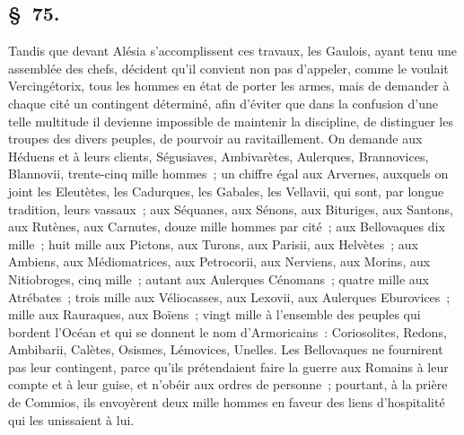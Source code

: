 \documentclass[french,twoside]{book} %
\begin{document}
\subsection[{§ 75.}]{ \textsc{§ 75.} }
\noindent Tandis que devant Alésia s’accomplissent ces travaux, les Gaulois, ayant tenu une assemblée des chefs, décident qu’il convient non pas d’appeler, comme le voulait Vercingétorix, tous les hommes en état de porter les armes, mais de demander à chaque cité un contingent déterminé, afin d’éviter que dans la confusion d’une telle multitude il devienne impossible de maintenir la discipline, de distinguer les troupes des divers peuples, de pourvoir au ravitaillement. On demande aux Héduens et à leurs clients, Ségusiaves, Ambivarètes, Aulerques, Brannovices, Blannovii, trente-cinq mille hommes ; un chiffre égal aux Arvernes, auxquels on joint les Eleutètes, les Cadurques, les Gabales, les Vellavii, qui sont, par longue tradition, leurs vassaux ; aux Séquanes, aux Sénons, aux Bituriges, aux Santons, aux Rutènes, aux Carnutes, douze mille hommes par cité ; aux Bellovaques dix mille ; huit mille aux Pictons, aux Turons, aux Parisii, aux Helvètes ; aux Ambiens, aux Médiomatrices, aux Petrocorii, aux Nerviens, aux Morins, aux Nitiobroges, cinq mille ; autant aux Aulerques Cénomans ; quatre mille aux Atrébates ; trois mille aux Véliocasses, aux Lexovii, aux Aulerques Eburovices ; mille aux Rauraques, aux Boïens ; vingt mille à l’ensemble des peuples qui bordent l’Océan et qui se donnent le nom d’Armoricains : Coriosolites, Redons, Ambibarii, Calètes, Osismes, Lémovices, Unelles. Les Bellovaques ne fournirent pas leur contingent, parce qu’ils prétendaient faire la guerre aux Romains à leur compte et à leur guise, et n’obéir aux ordres de personne ; pourtant, à la prière de Commios, ils envoyèrent deux mille hommes en faveur des liens d’hospitalité qui les unissaient à lui.
\end{document}
